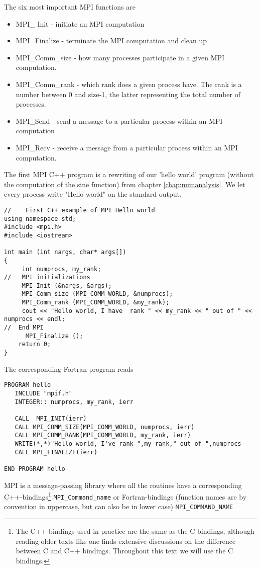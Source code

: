 The six  most important MPI functions are 
\begin{itemize}
\item MPI\_ Init - initiate an MPI computation
\item MPI\_Finalize - terminate the MPI computation and clean up
\item MPI\_Comm\_size - how many processes participate in a given MPI computation.
\item MPI\_Comm\_rank - which rank does a given process have. 
The rank is a number between 0 and size-1, the latter representing
the total number of processes.
\item MPI\_Send - send a message to a particular process within an MPI
computation
\item MPI\_Recv - receive a message from a particular process within an MPI computation.
\end{itemize}

The first MPI C++ program  is a rewriting of our 'hello world' program 
(without the computation of the sine function) 
from chapter \ref{chap:numanalysis}.
We let every process write "Hello world" on the standard output.
\lstset{language=c++}
\begin{lstlisting}[title={\url{http://folk.uio.no/mhjensen/compphys/programs/chapter05/program2.cpp}}]
//    First C++ example of MPI Hello world
using namespace std;
#include <mpi.h>
#include <iostream>

int main (int nargs, char* args[])
{
     int numprocs, my_rank;
//   MPI initializations
     MPI_Init (&nargs, &args);
     MPI_Comm_size (MPI_COMM_WORLD, &numprocs);
     MPI_Comm_rank (MPI_COMM_WORLD, &my_rank);
     cout << "Hello world, I have  rank " << my_rank << " out of " << numprocs << endl;
//  End MPI
      MPI_Finalize ();
    return 0;
}
\end{lstlisting}
The corresponding Fortran program reads
\lstset{language=[90]Fortran}
\begin{lstlisting}
PROGRAM hello
   INCLUDE "mpif.h"
   INTEGER:: numprocs, my_rank, ierr

   CALL  MPI_INIT(ierr)
   CALL MPI_COMM_SIZE(MPI_COMM_WORLD, numprocs, ierr)
   CALL MPI_COMM_RANK(MPI_COMM_WORLD, my_rank, ierr)
   WRITE(*,*)"Hello world, I've rank ",my_rank," out of ",numprocs
   CALL MPI_FINALIZE(ierr)

END PROGRAM hello
\end{lstlisting}
MPI is a message-passing library where all the routines
have a corresponding C++-bindings\footnote{The C++ bindings used in practice are the same as the C bindings, 
although reading older texts like \cite{mpiref,gropp1999,cmpi} one finds
extensive discussions on the difference between C and C++ bindings. 
Throughout this text we will use the C bindings.} \lstinline{MPI_Command_name} or 
Fortran-bindings (function names are by convention in uppercase, but can also be in lower case) \lstinline{MPI_COMMAND_NAME}

